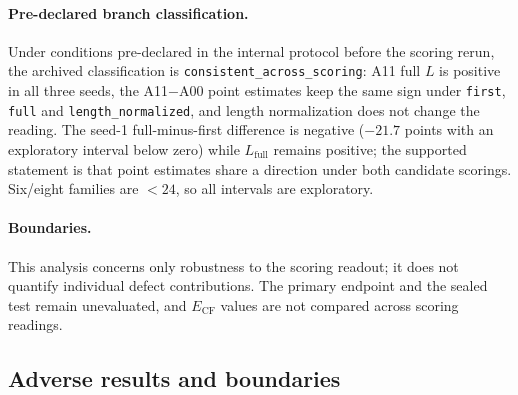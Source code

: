 \documentclass[11pt,twocolumn]{article}
\begin{document}
\paragraph{Pre-declared branch classification.} Under conditions pre-declared
in the internal protocol before the scoring rerun, the archived classification
is \texttt{consistent\_across\_scoring}: A11 full $L$ is positive in all three
seeds, the A11$-$A00 point estimates keep the same sign under \texttt{first},
\texttt{full} and \texttt{length\_normalized}, and length normalization does not
change the reading. The seed-1 full-minus-first difference is negative
($-21.7$ points with an exploratory interval below zero) while $L_{\mathrm{full}}$
remains positive; the supported statement is that point estimates share a
direction under both candidate scorings. Six/eight families are $<24$, so all
intervals are exploratory.

\paragraph{Boundaries.} This analysis concerns only robustness to the scoring
readout; it does not quantify individual defect contributions. The primary
endpoint and the sealed test remain unevaluated, and $E_{\mathrm{CF}}$ values
are not compared across scoring readings.

\subsection{Adverse results and boundaries}
\label{sec:adverse}
\end{document}
